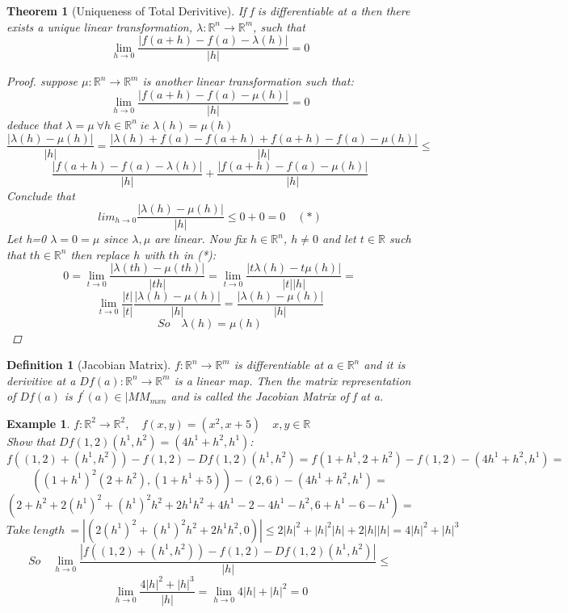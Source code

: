 \documentclass[12pt]{article}
\def\RR{\mathbb{R}}
\newtheorem{theorem}{Theorem}[section]
\newtheorem{definition}{Definition}[section]
\newtheorem{example}{Example}[section]
\begin{document}
\begin{theorem}[Uniqueness of Total Derivitive]\label{T:Uniqueness of Total Derivitive}
If f is differentiable at a then there exists a unique linear transformation, $ \lambda:\RR^{n} \rightarrow \RR^{m}$, such that
\[\lim_{h \to 0}\frac{|f(a+h) - f(a) - \lambda(h)|}{|h|} =0 \]
\begin{proof}
suppose $ \mu:\RR^{n} \rightarrow \RR^{m}$ is another linear transformation such that:
\[\lim_{h \to 0}\frac{|f(a+h) - f(a) - \mu(h)|}{|h|} =0 \]
deduce that $\lambda= \mu \:\forall h\in\RR^{n} \; ie\; \lambda(h)= \mu(h)$
\[\frac{|\lambda(h)- \mu(h)|}{|h|}= \frac{|\lambda(h) +f(a) -f(a+h) +f(a+h) -f(a)- \mu(h)|}{|h|} \leq \] 
\[\frac{|f(a+h) -f(a) -\lambda(h)|}{|h|} +  \frac{|f(a+h) -f(a) -\mu(h)|}{|h|}\]
Conclude that \[lim_{h \to 0}\frac{|\lambda(h)- \mu(h)|}{|h|} \leq 0 + 0 =0 \quad (*)\]
Let h=0 $\lambda= 0=\mu$ since $\lambda, \mu$ are linear. Now fix $h \in \RR^{n}$, $h\neq0$ and let $t\in\RR$ such that $th\in\RR^{n} $ then replace $h$ with $th$ in (*):
\[0 =\lim_{t \to 0}\frac{|\lambda(th)- \mu(th)|}{|th|}= \lim_{t \to 0}\frac{|t\lambda(h)- t\mu(h)|}{|t||h|} =\]  
\[\lim_{t \to 0}\frac{|t|}{|t|}\frac{|\lambda(h)- \mu(h)|}{|h|}= \frac{|\lambda(h)- \mu(h)|}{|h|} \]
\[So\quad \lambda(h)=\mu(h)\]
\end{proof}
\end{theorem}

\begin{definition}[Jacobian Matrix]\label{D:Jacobian Matrix}
$f:\RR^{n} \rightarrow \RR^{m}$ is differentiable at $a \in \RR^{n}$ and it is derivitive at a $Df(a):\RR^{n} \rightarrow \RR^{m}$ is a linear map. Then the matrix representation of $Df(a)$ is $f^{'}(a) \in |MM_{mxn}$ and is called the Jacobian Matrix of f at a.
\end{definition}

\begin{example}\label{Df example}
$f:\RR^{2} \rightarrow \RR^{2}, \quad f(x,y)=(x^{2},x+5) \quad x,y \in \RR$\\
Show that $Df(1,2)(h^{1}, h^{2})=(4h^{1} +  h^{2}, h^{1})$:
\[f((1,2) +(h^{1}, h^{2})) - f(1,2) -Df(1,2)(h^{1}, h^{2})= f(1+h^{1}, 2+ h^{2}) - f(1,2) - (4h^{1}+ h^{2}, h^{1})=\]
\[((1+h^{1})^{2}(2+ h^{2}), (1+h^{1} +5)) - (2,6)  - (4h^{1}+ h^{2}, h^{1})=\]
\[(2+ h^{2} + 2(h^{1})^{2} +(h^{1})^{2}h^{2} + 2h^{1}h^{2} + 4h^{1} -2 -4h^{1} -h^{2}, 6+h^{1} - 6 -h^{1})=\]
\[Take \; length\: =| (2(h^{1})^{2} +(h^{1})^{2}h^{2} + 2h^{1}h^{2}, 0)| \leq 2|h|^{2} +|h|^{2}|h| + 2|h||h| = 4|h|^{2} + |h|^{3}\]
\[So\quad \lim_{h \to 0}\frac{|f((1,2) +(h^{1}, h^{2})) - f(1,2) -Df(1,2)(h^{1}, h^{2})|}{|h|} \leq \] 
\[ \lim_{h \to 0}\frac{4|h|^{2} + |h|^{3}}{|h|} =  \lim_{h \to 0}4|h| + |h|^{2}=0\]
\end{example}
\end{document}
